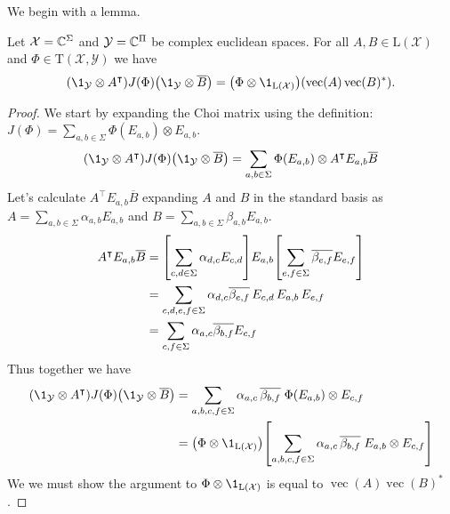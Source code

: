 \documentclass[boxes,pages,color=SeaGreen]{homework}
\renewcommand{\vec}{\operatorname{vec}}
\newcommand{\X}{\mathcal{X}}
\newcommand{\Y}{\mathcal{Y}}
\newcommand{\Lin}{\mathrm{L}}
\newcommand{\Trans}{\mathrm{T}}
\begin{document}
\begin{solution}
    We begin with a lemma.
    \begin{lemma}
        Let $\X = \C^\Sigma$ and $\Y = \C^\Pi$ be complex euclidean spaces.
        For all $A, B\in\Lin(\X)$ and $\Phi\in\Trans(\X, \Y)$ we have
        \begin{equation*}
            \qty(\1_\Y\otimes A^\intercal)J(\Phi)\qty(\1_\Y\otimes\overline{B}) = \qty(\Phi\otimes\1_{\Lin(\X)})(\vec(A)\vec(B)^*).
        \end{equation*}
    \end{lemma}
    \begin{proof}
        We start by expanding the Choi matrix using the definition: $J(\Phi) = \sum_{a,b\in\Sigma}\Phi(E_{a,b})\otimes E_{a,b}$.
        \begin{equation*}
            \qty(\1_\Y\otimes A^\intercal)J(\Phi)\qty(\1_\Y\otimes\overline{B}) = \sum_{a,b\in\Sigma}\Phi(E_{a,b})\otimes A^\intercal E_{a,b}\overline{B}
        \end{equation*}
        Let's calculate $A^\intercal E_{a,b}\overline{B}$ expanding $A$ and $B$ in the standard basis as $A = \sum_{a,b\in\Sigma}\alpha_{a,b}E_{a,b}$ and $B = \sum_{a,b\in\Sigma}\beta_{a,b}E_{a,b}$.
        \begin{align*}
            A^\intercal E_{a,b}\overline{B} & = \qty[\sum_{c,d\in\Sigma}\alpha_{d,c}E_{c,d}]E_{a,b}\qty[\sum_{e,f\in\Sigma}\overline{\beta_{e,f}}E_{e,f}] \\
                                            & = \sum_{c,d,e,f\in\Sigma}\alpha_{d,c}\overline{\beta_{e,f}}\,E_{c,d}\,E_{a,b}\,E_{e,f}                      \\
                                            & = \sum_{c,f\in\Sigma}\alpha_{a,c}\overline{\beta_{b,f}}E_{c,f}
        \end{align*}
        Thus together we have
        \begin{align*}
            \qty(\1_\Y\otimes A^\intercal)J(\Phi)\qty(\1_\Y\otimes\overline{B}) & = \sum_{a,b,c,f\in\Sigma}\alpha_{a,c}\,\overline{\beta_{b,f}}\;\Phi(E_{a,b})\otimes E_{c,f}                               \\
                                                                                & = \qty(\Phi\otimes\1_{\Lin(\X)})\qty[\sum_{a,b,c,f\in\Sigma}\alpha_{a,c}\,\overline{\beta_{b,f}}\;E_{a,b}\otimes E_{c,f}]
        \end{align*}
        We we must show the argument to $\Phi\otimes\1_{\Lin(\X)}$ is equal to $\vec(A)\vec(B)^*$.

\end{proof}
\end{solution}
\end{document}
